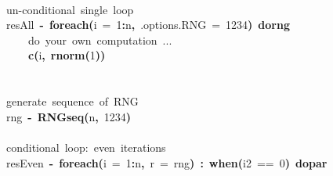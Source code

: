 \documentclass[a4paper,12pt]{article}\usepackage{graphicx, color}
\makeatletter
\newcommand{\hlnumber}[1]{\textcolor[rgb]{0,0,0}{#1}}%
\newcommand{\hlfunctioncall}[1]{\textcolor[rgb]{0.501960784313725,0,0.329411764705882}{\textbf{#1}}}%
\newcommand{\hlkeyword}[1]{\textcolor[rgb]{0,0,0}{\textbf{#1}}}%
\newcommand{\hlargument}[1]{\textcolor[rgb]{0.690196078431373,0.250980392156863,0.0196078431372549}{#1}}%
\newcommand{\hlcomment}[1]{\textcolor[rgb]{0.180392156862745,0.6,0.341176470588235}{#1}}%
\newcommand{\hlassignement}[1]{\textcolor[rgb]{0,0,0}{\textbf{#1}}}%
\newcommand{\hlsymbol}[1]{\textcolor[rgb]{0,0,0}{#1}}%
\newcommand{\hlstd}[1]{\textcolor[rgb]{0,0,0}{#1}}%
\newenvironment{kframe}{%
 \def\FrameCommand##1{\hskip\@totalleftmargin \hskip-\fboxsep
 \colorbox{shadecolor}{##1}\hskip-\fboxsep
     \hskip-\linewidth \hskip-\@totalleftmargin \hskip\columnwidth}%
 \MakeFramed {\advance\hsize-\width
   \@totalleftmargin\z@ \linewidth\hsize
   \@setminipage}}%
 {\par\unskip\endMakeFramed}
\newenvironment{knitrout}{}{} %
\renewenvironment{knitrout}{\begin{footnotesize}}{\end{footnotesize}}
\makeatother
\begin{document}
\begin{knitrout}
\color{fgcolor}\begin{kframe}
\begin{flushleft}
\ttfamily\noindent
\hspace*{\fill}\\
\hlstd{}\hlcomment{\usebox{\hlnormalsizeboxhash}{\ }un-conditional{\ }single{\ }loop}\hspace*{\fill}\\
\hlstd{}\hlsymbol{resAll}{\ }\hlassignement{\usebox{\hlnormalsizeboxlessthan}-}{\ }\hlfunctioncall{foreach}\hlkeyword{(}\hlargument{i}{\ }\hlargument{=}{\ }\hlnumber{1}\hlkeyword{:}\hlsymbol{n}\hlkeyword{,}{\ }\hlargument{.options.RNG}{\ }\hlargument{=}{\ }\hlnumber{1234}\hlkeyword{)}{\ }\hlkeyword{\usebox{\hlnormalsizeboxpercent}dorng\usebox{\hlnormalsizeboxpercent}}{\ }\hlkeyword{\usebox{\hlnormalsizeboxopenbrace}}\hspace*{\fill}\\
\hlstd{}{\ }{\ }{\ }{\ }\hlcomment{\usebox{\hlnormalsizeboxhash}{\ }do{\ }your{\ }own{\ }computation{\ }...}\hspace*{\fill}\\
\hlstd{}{\ }{\ }{\ }{\ }\hlfunctioncall{c}\hlkeyword{(}\hlsymbol{i}\hlkeyword{,}{\ }\hlfunctioncall{rnorm}\hlkeyword{(}\hlnumber{1}\hlkeyword{)}\hlkeyword{)}\hspace*{\fill}\\
\hlstd{}\hlkeyword{\usebox{\hlnormalsizeboxclosebrace}}\hspace*{\fill}\\
\hlstd{}\hspace*{\fill}\\
\hlstd{}\hlcomment{\usebox{\hlnormalsizeboxhash}{\ }generate{\ }sequence{\ }of{\ }RNG}\hspace*{\fill}\\
\hlstd{}\hlsymbol{rng}{\ }\hlassignement{\usebox{\hlnormalsizeboxlessthan}-}{\ }\hlfunctioncall{RNGseq}\hlkeyword{(}\hlsymbol{n}\hlkeyword{,}{\ }\hlnumber{1234}\hlkeyword{)}\hspace*{\fill}\\
\hlstd{}\hspace*{\fill}\\
\hlstd{}\hlcomment{\usebox{\hlnormalsizeboxhash}{\ }conditional{\ }loop:{\ }even{\ }iterations}\hspace*{\fill}\\
\hlstd{}\hlsymbol{resEven}{\ }\hlassignement{\usebox{\hlnormalsizeboxlessthan}-}{\ }\hlfunctioncall{foreach}\hlkeyword{(}\hlargument{i}{\ }\hlargument{=}{\ }\hlnumber{1}\hlkeyword{:}\hlsymbol{n}\hlkeyword{,}{\ }\hlargument{r}{\ }\hlargument{=}{\ }\hlsymbol{rng}\hlkeyword{)}{\ }\hlkeyword{\usebox{\hlnormalsizeboxpercent}:\usebox{\hlnormalsizeboxpercent}}{\ }\hlfunctioncall{when}\hlkeyword{(}\hlsymbol{i}\hlkeyword{\usebox{\hlnormalsizeboxpercent}\usebox{\hlnormalsizeboxpercent}}\hlnumber{2}{\ }=={\ }\hlnumber{0}\hlkeyword{)}{\ }\hlkeyword{\usebox{\hlnormalsizeboxpercent}dopar\usebox{\hlnormalsizeboxpercent}}{\ }\hlkeyword{\usebox{\hlnormalsizeboxopenbrace}}\hspace*{\fill}\\

\end{flushleft}
\end{kframe}
\end{knitrout}
\end{document}
